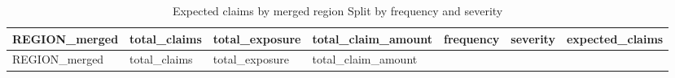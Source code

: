 \documentclass[
  english,
  11pt,
]{article}
\begin{document}
\begin{longtable}[]{@{}
  >{\raggedright\arraybackslash}p{}
  >{\raggedright\arraybackslash}p{}
  >{\raggedright\arraybackslash}p{}
  >{\raggedright\arraybackslash}p{}
  >{\raggedright\arraybackslash}p{}
  >{\raggedright\arraybackslash}p{}
  >{\raggedright\arraybackslash}p{}@{}}
\caption{Expected claims by merged region Split by frequency and
severity}\tabularnewline
\toprule\noalign{}
\begin{minipage}[b]{\linewidth}\raggedright
REGION\_merged
\end{minipage} & \begin{minipage}[b]{\linewidth}\raggedright
total\_claims
\end{minipage} & \begin{minipage}[b]{\linewidth}\raggedright
total\_exposure
\end{minipage} & \begin{minipage}[b]{\linewidth}\raggedright
total\_claim\_amount
\end{minipage} & \begin{minipage}[b]{\linewidth}\raggedright
frequency
\end{minipage} & \begin{minipage}[b]{\linewidth}\raggedright
severity
\end{minipage} & \begin{minipage}[b]{\linewidth}\raggedright
expected\_claims
\end{minipage} \\
\midrule\noalign{}
\endfirsthead
\toprule\noalign{}
\begin{minipage}[b]{\linewidth}\raggedright
REGION\_merged
\end{minipage} & \begin{minipage}[b]{\linewidth}\raggedright
total\_claims
\end{minipage} & \begin{minipage}[b]{\linewidth}\raggedright
total\_exposure
\end{minipage} & \begin{minipage}[b]{\linewidth}\raggedright
total\_claim\_amount
\end{minipage} & \begin{minipage}[b]{\linewidth}\raggedright

\end{minipage}
\end{longtable}
\end{document}
